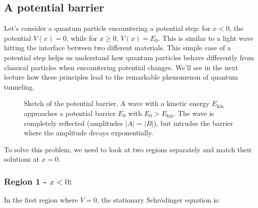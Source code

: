 \documentclass[
  a4paper,
]{book}
\begin{document}
\subsection{A potential barrier}\label{a-potential-barrier}

Let's consider a quantum particle encountering a potential step: for
\(x < 0\), the potential \(V(x) = 0\), while for \(x ≥ 0\),
\(V(x) = E_0\). This is similar to a light wave hitting the interface
between two different materials. This simple case of a potential step
helps us understand how quantum particles behave differently from
classical particles when encountering potential changes. We'll see in
the next lecture how these principles lead to the remarkable phenomenon
of quantum tunneling.

\begin{figure}


\caption{\label{fig-potential-barrier-1}Sketch of the potential barrier.
A wave with a kinetic energy \(E_{\mathrm{kin}}\) approaches a potential
barrier \(E_0\) with \(E_0 > E_{\mathrm{kin}}\). The wave is completely
reflected (amplitudes \(\left|A\right|\) = \(\left|B\right|\)), but
intrudes the barrier where the amplitude decays exponentially.}

\end{figure}%

To solve this problem, we need to look at two regions separately and
match their solutions at \(x = 0\).

\subsubsection{\texorpdfstring{Region 1 -
\(x < 0\):}{Region 1 - x \textless{} 0:}}\label{region-1---x-0}

In the first region where \(V = 0\), the stationary Schrödinger equation
is:
\end{document}

